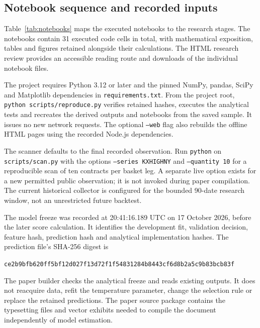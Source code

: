 \label{app:reproducibility}
\subsection{Notebook sequence and recorded inputs}
Table~\ref{tab:notebooks} maps the executed notebooks to the research stages. The notebooks contain 31 executed code cells in total, with mathematical exposition, tables and figures retained alongside their calculations. The HTML research review provides an accessible reading route and downloads of the individual notebook files.


The project requires Python 3.12 or later and the pinned NumPy, pandas, SciPy and Matplotlib dependencies in \texttt{requirements.txt}. From the project root, \texttt{python scripts/reproduce.py} verifies retained hashes, executes the analytical tests and recreates the derived outputs and notebooks from the saved sample. It issues no new network requests. The optional \texttt{--web} flag also rebuilds the offline HTML pages using the recorded Node.js dependencies.

The scanner defaults to the final recorded observation. Run \texttt{python} on \nolinkurl{scripts/scan.py} with the options \texttt{--series KXHIGHNY} and \texttt{--quantity 10} for a reproducible scan of ten contracts per basket leg. A separate live option exists for a new permitted public observation; it is not invoked during paper compilation. The current historical collector is configured for the bounded 90-date research window, not an unrestricted future backtest.

The model freeze was recorded at 20:41:16.189 UTC on 17 October 2026, before the later score calculation. It identifies the development fit, validation decision, feature hash, prediction hash and analytical implementation hashes. The prediction file's SHA-256 digest is
\begin{center}\fontsize{9.3}{11.5}\selectfont
\nolinkurl{ce2b9bfb620ff5bf12d027f13d72f1f54831284b8443cf6d8b2a5c9b83bcb83f}
\end{center}
The paper builder checks the analytical freeze and reads existing outputs. It does not reacquire data, refit the temperature parameter, change the selection rule or replace the retained predictions. The paper source package contains the typesetting files and vector exhibits needed to compile the document independently of model estimation.

